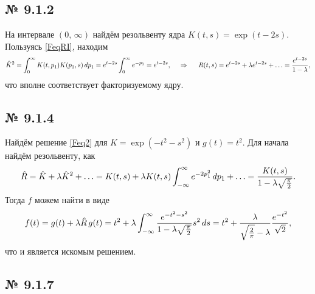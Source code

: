 \subsection*{№ 9.1.2}

На интервале $(0,\, \infty)$ найдём резольвенту ядра $K(t, s) = \exp(t-2s)$. 
Пользуясь \eqref{FeqRI}, находим
\begin{equation*}
	\hat{K}^2 = \int_{0}^{\infty} K(t, p_1) K(p_1, s) \, d p_1 = e^{t-2s} \int_{0}^{\infty} e^{-p_1}  = e^{t-2s},
	\hspace{0.5cm} \Rightarrow \hspace{0.5cm}
	R(t, s) = e^{t-2s} + \lambda e^{t-2s} + \ldots = \frac{e^{t-2s}}{1-\lambda},
\end{equation*}
что вполне соответствует факторизуемому ядру.


\subsection*{№ 9.1.4}

Найдём решение \eqref{Feq2} для $K = \exp\left(-t^2-s^2\right)$ и $g(t) = t^2$. 
Для начала найдём резольвенту, как
\begin{equation*}
	\hat{R} = \hat{K} + \lambda \hat{K}^2 + \ldots = 
	K(t, s) + \lambda K(t, s) \int_{-\infty}^{\infty} e^{-2 p_1^2} \, d p_1  +
	\ldots = \frac{K(t, s)}{1 - \lambda \sqrt{\frac{\pi}{2}}}.
\end{equation*}
Тогда $f$ можем найти в виде
\begin{equation*}
	f(t) = g(t) + \lambda \hat{R}\, g(t) = t^2 + \lambda \int_{-\infty}^{\infty} \frac{e^{-t^2 - s^2}}{1 - \lambda \sqrt{\frac{\pi}{2}}} s^2 \, d s = 
	t^2 + \frac{\lambda}{\sqrt{\frac{2}{\pi}}-\lambda} \frac{e^{-t^2}}{\sqrt{2}},
\end{equation*}
что и является искомым решением.








\subsection*{№ 9.1.7}

